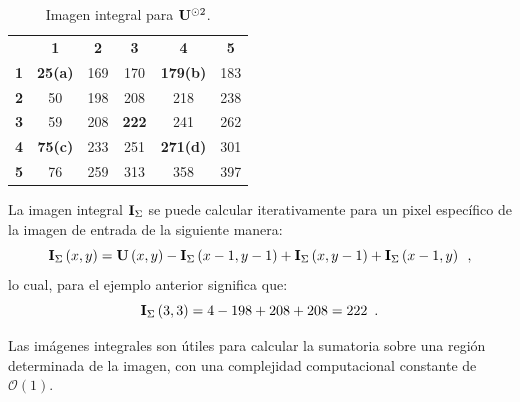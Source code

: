 \begin{table}[bt]
\caption{Imagen integral para $\mathbf{U}^{\odot2}$.\label{table:integralcuad}}
\begin{center}
\renewcommand{\arraystretch}{1.4}
\setlength\tabcolsep{3pt}
{
\begin{tabular}{cc|ccc|c}
 & \multicolumn{1}{c}{\textbf{1}} & \textbf{2} & \textbf{3} & \multicolumn{1}{c}{\textbf{4}} & \textbf{5}\tabularnewline
\textbf{1} & \multicolumn{1}{c}{\textbf{25(a)}} & 169 & 170 & \multicolumn{1}{c}{\textbf{179(b)}} & 183\tabularnewline
\cline{3-5} 
\textbf{2} & 50 & 198 & 208 & 218 & 238\tabularnewline
\textbf{3} & 59 & 208 & \textbf{222} & 241 & 262\tabularnewline
\textbf{4} & \textbf{75(c)} & 233 & 251 & \textbf{271(d)} & 301\tabularnewline
\cline{3-5} 
\textbf{5} & \multicolumn{1}{c}{76} & 259 & 313 & \multicolumn{1}{c}{358} & 397\tabularnewline
\end{tabular}
}
\par\end{center}
\end{table}


La imagen integral $\mathbf{I}_{\Sigma}$ se puede calcular iterativamente para un pixel específico de la imagen de entrada  de la siguiente manera: 
\begin{equation}
\mathbf{I}_{\Sigma}\left(x,y\right)=\mathbf{U}\left(x,y\right)-\mathbf{I}_{\Sigma}\left(x-1,y-1\right)+\mathbf{I}_{\Sigma}\left(x,y-1\right)
+\mathbf{I}_{\Sigma}\left(x-1,y\right) \enspace ,
\end{equation}
%
lo cual, para el ejemplo anterior significa que:
%
\begin{equation}
\mathbf{I}_{\Sigma}\left(3,3\right)=4-198+208+208=222 \enspace .
\end{equation}

Las imágenes integrales son útiles para calcular la sumatoria sobre una región determinada de la imagen, con una complejidad computacional constante de $\mathcal{O}(1)$. 

